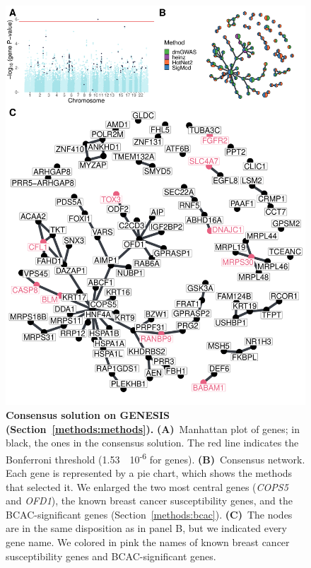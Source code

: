 \documentclass[10pt,letterpaper]{article}
\providecommand{\DIFaddbeginFL}{} %
\providecommand{\DIFaddendFL}{} %
\providecommand{\DIFdelbeginFL}{} %
\providecommand{\DIFdelendFL}{} %
\newcommand{\DIFscaledelfig}{0.5}
\newlength{\DIFdelgraphicswidth} %
\newlength{\DIFdelgraphicsheight} %
\newcommand{\DIFaddincludegraphics}[2][]{{\color{blue}\fbox{\DIFOincludegraphics[#1]{#2}}}} %
\newcommand{\DIFdelincludegraphics}[2][]{%
\sbox{\DIFdelgraphicsbox}{\DIFOincludegraphics[#1]{#2}}%
\settoboxwidth{\DIFdelgraphicswidth}{\DIFdelgraphicsbox} %
\settoboxtotalheight{\DIFdelgraphicsheight}{\DIFdelgraphicsbox} %
\scalebox{\DIFscaledelfig}{%
\parbox[b]{\DIFdelgraphicswidth}{\usebox{\DIFdelgraphicsbox}\\[-\baselineskip] \rule{\DIFdelgraphicswidth}{0em}}\llap{\resizebox{\DIFdelgraphicswidth}{\DIFdelgraphicsheight}{%
\setlength{\unitlength}{\DIFdelgraphicswidth}%
\begin{picture}(1,1)%
\thicklines\linethickness{2pt} %
{\color[rgb]{1,0,0}\put(0,0){\framebox(1,1){}}}%
{\color[rgb]{1,0,0}\put(0,0){\line( 1,1){1}}}%
{\color[rgb]{1,0,0}\put(0,1){\line(1,-1){1}}}%
\end{picture}%
}\hspace*{3pt}}} %
} %
\DeclareRobustCommand{\DIFaddbeginFL}{\DIFOaddbeginFL \let\includegraphics\DIFaddincludegraphics} %
\DeclareRobustCommand{\DIFaddendFL}{\DIFOaddendFL \let\includegraphics\DIFOincludegraphics} %
\DeclareRobustCommand{\DIFdelbeginFL}{\DIFOdelbeginFL \let\includegraphics\DIFdelincludegraphics} %
\DeclareRobustCommand{\DIFdelendFL}{\DIFOaddendFL \let\includegraphics\DIFOincludegraphics} %
\begin{document}
\begin{figure}[!ht]
  \centering
  \DIFdelbeginFL %
\DIFdelendFL \DIFaddbeginFL \includegraphics[width=.9\linewidth]{./figures/figure_2.pdf}
  \DIFaddendFL \caption{ \textbf{Consensus solution on GENESIS (Section~\ref{methods:methods}).} \textbf{(A)}~Manhattan plot of genes; in black, the ones in the consensus solution. The red line indicates the Bonferroni threshold (1.53~\texttimes{}~10\textsuperscript{-6} for genes). \textbf{(B)}~Consensus network. Each gene is represented by a pie chart, which shows the methods that selected it. We enlarged the two most central genes (\emph{COPS5} and \emph{OFD1}), the known breast cancer susceptibility genes, and the BCAC-significant genes (Section~\ref{methods:bcac}). \textbf{(C)}~The nodes are in the same disposition as in panel B, but we indicated every gene name. We colored in pink the names of known breast cancer susceptibility genes and BCAC-significant genes.}
  \label{fig:consensus}
\end{figure}
\end{document}
